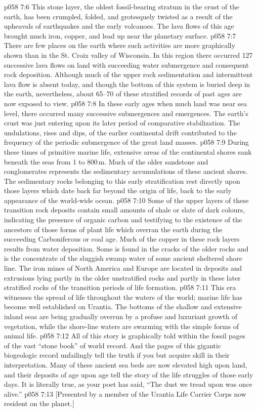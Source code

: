\vs p058 7:6 This stone layer, the oldest fossil\hyp{}bearing stratum in the crust of the earth, has been crumpled, folded, and grotesquely twisted as a result of the upheavals of earthquakes and the early volcanoes. The lava flows of this age brought much iron, copper, and lead up near the planetary surface.
\vs p058 7:7 There are few places on the earth where such activities are more graphically shown than in the St. Croix valley of Wisconsin. In this region there occurred 127 successive lava flows on land with succeeding water submergence and consequent rock deposition. Although much of the upper rock sedimentation and intermittent lava flow is absent today, and though the bottom of this system is buried deep in the earth, nevertheless, about 65--70 of these stratified records of past ages are now exposed to view.
\vs p058 7:8 \pc In these early ages when much land was near sea level, there occurred many successive submergences and emergences. The earth’s crust was just entering upon its later period of comparative stabilization. The undulations, rises and dips, of the earlier continental drift contributed to the frequency of the periodic submergence of the great land masses.
\vs p058 7:9 During these times of primitive marine life, extensive areas of the continental shores sank beneath the seas from 1 to 800\,m. Much of the older sandstone and conglomerates represents the sedimentary accumulations of these ancient shores. The sedimentary rocks belonging to this early stratification rest directly upon those layers which date back far beyond the origin of life, back to the early appearance of the world\hyp{}wide ocean.
\vs p058 7:10 Some of the upper layers of these transition rock deposits contain small amounts of shale or slate of dark colours, indicating the presence of organic carbon and testifying to the existence of the ancestors of those forms of plant life which overran the earth during the succeeding Carboniferous or coal age. Much of the copper in these rock layers results from water deposition. Some is found in the cracks of the older rocks and is the concentrate of the sluggish swamp water of some ancient sheltered shore line. The iron mines of North America and Europe are located in deposits and extrusions lying partly in the older unstratified rocks and partly in these later stratified rocks of the transition periods of life formation.
\vs p058 7:11 \pc This era witnesses the spread of life throughout the waters of the world; marine life has become well established on Urantia. The bottoms of the shallow and extensive inland seas are being gradually overrun by a profuse and luxuriant growth of vegetation, while the shore\hyp{}line waters are swarming with the simple forms of animal life.
\vs p058 7:12 \pc All of this story is graphically told within the fossil pages of the vast “stone book” of world record. And the pages of this gigantic biogeologic record unfailingly tell the truth if you but acquire skill in their interpretation. Many of these ancient sea beds are now elevated high upon land, and their deposits of age upon age tell the story of the life struggles of those early days. It is literally true, as your poet has said, “The dust we tread upon was once alive.”
\vsetoff
\vs p058 7:13 [Presented by a member of the Urantia Life Carrier Corps now resident on the planet.]
\quizlink
